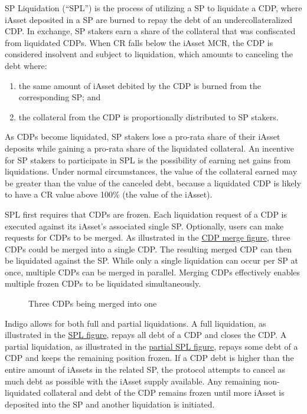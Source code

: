 \documentclass{article}
\begin{document}
\begin{sloppypar}
SP Liquidation (``SPL'') is the process of utilizing a SP to liquidate a
CDP, where iAsset deposited in a SP are burned to repay the debt of an
undercollateralized CDP. In exchange, SP stakers earn a share of the
collateral that was confiscated from liquidated CDPs. When CR falls
below the iAsset MCR, the CDP is considered insolvent and subject to
liquidation, which amounts to canceling the debt where:

\begin{enumerate}
\item
  the same amount of iAsset debited by the CDP is burned from the
  corresponding SP; and
\item
  the collateral from the CDP is proportionally distributed to SP
  stakers.
\end{enumerate}

As CDPs become liquidated, SP stakers lose a pro-rata share of their
iAsset deposits while gaining a pro-rata share of the liquidated
collateral. An incentive for SP stakers to participate in SPL is the
possibility of earning net gains from liquidations. Under normal
circumstances, the value of the collateral earned may be greater than
the value of the canceled debt, because a liquidated CDP is likely to
have a CR value above 100\% (the value of the iAsset).

SPL first requires that CDPs are frozen. Each liquidation request of a
CDP is executed against its iAsset's associated single SP. Optionally,
users can make requests for CDPs to be merged. As illustrated in the
\protect\hyperlink{cdp-merge-figure}{CDP merge figure}, three CDPs could
be merged into a single CDP. The resulting merged CDP can then be
liquidated against the SP. While only a single liquidation can occur per
SP at once, multiple CDPs can be merged in parallel. Merging CDPs
effectively enables multiple frozen CDPs to be liquidated
simultaneously.

\hypertarget{cdp-merge-figure}{%
\begin{figure}[htbp]
\centering

\caption{Three CDPs being merged into one}
\label{cdp-merge-figure}
\end{figure}}

Indigo allows for both full and partial liquidations. A full
liquidation, as illustrated in the \protect\hyperlink{spl-figure}{SPL
figure}, repays all debt of a CDP and closes the CDP. A partial
liquidation, as illustrated in the
\protect\hyperlink{spl-figure}{partial SPL figure}, repays some debt of
a CDP and keeps the remaining position frozen. If a CDP debt is higher
than the entire amount of iAssets in the related SP, the protocol
attempts to cancel as much debt as possible with the iAsset supply
available. Any remaining non-liquidated collateral and debt of the CDP
remains frozen until more iAsset is deposited into the SP and another
liquidation is initiated.


\end{sloppypar}
\end{document}
